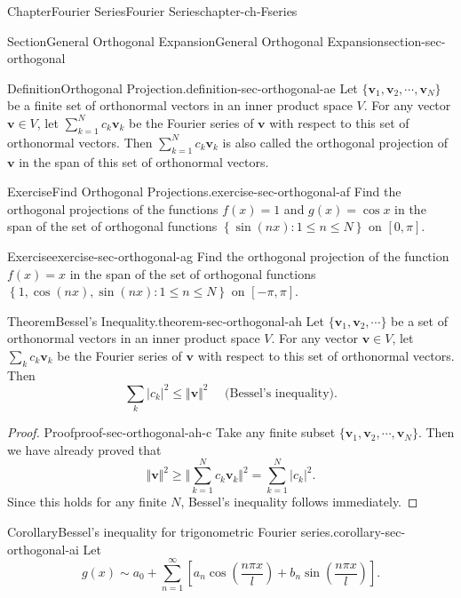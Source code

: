 \documentclass[oneside,10pt,]{book}
\numberwithin{equation}{section}
\newcommand{\bv}{\mathbf{v}}
\begin{document}
\begin{chapterptx}{Chapter}{Fourier Series}{}{Fourier Series}{}{}{chapter-ch-Fseries}
\begin{sectionptx}{Section}{General Orthogonal Expansion}{}{General Orthogonal Expansion}{}{}{section-sec-orthogonal}
\begin{definition}{Definition}{Orthogonal Projection.}{definition-sec-orthogonal-ae}
 Let \(\{\bv_{1}, \bv_{2},\cdots, \bv_{N} \}\) be a finite set of orthonormal vectors in an inner product space \(V\). For any vector \(\bv\in V\), let \(\sum_{k=1}^{N} c_{k} \bv_{k}\) be the Fourier series of \(\bv\) with respect to this set of orthonormal vectors. Then \(\sum_{k=1}^{N} c_{k} \bv_{k}\) is also called the orthogonal projection of \(\bv\) in the span of this set of orthonormal vectors.\end{definition}
\begin{inlineexercise}{Exercise}{Find Orthogonal Projections.}{exercise-sec-orthogonal-af}%
Find the orthogonal projections of the functions \(f(x)=1\) and \(g(x)=\cos x\)  in the span of  the set of orthogonal functions \(\left\{ \sin (nx): 1\le n \le  N\right\}\) on \([0, \pi]\).\end{inlineexercise}%
\begin{inlineexercise}{Exercise}{}{exercise-sec-orthogonal-ag}%
Find the orthogonal projection of the function \(f(x)=x\) in the span of  the set of orthogonal functions \(\left\{1, \cos (nx),  \sin (nx): 1\le n \le  N\right\}\) on \([-\pi, \pi]\).\end{inlineexercise}%
\begin{theorem}{Theorem}{Bessel's Inequality.}{}{theorem-sec-orthogonal-ah}%
Let \(\{\bv_{1}, \bv_{2},\cdots \}\) be a set of orthonormal vectors in an inner product space \(V\). For any vector \(\bv\in V\), let \(\sum_{k} c_{k} \bv_{k}\) be the Fourier series of \(\bv\) with respect to this set of orthonormal vectors. Then%
\begin{equation*}
\sum_{k} |c_{k}|^{2}\le \Vert \bv\Vert^{2} \quad\text{ (Bessel's inequality)}.
\end{equation*}
\end{theorem}
\begin{proof}{Proof}{}{proof-sec-orthogonal-ah-c}
Take any finite subset \(\{\bv_{1}, \bv_{2},\cdots, \bv_{N}\}\). Then we have already proved that%
\begin{equation*}
\Vert \bv\Vert^{2}\ge \Vert \sum_{k=1}^{N }  c_{k }\bv_{k}\Vert^{2}=  \sum_{k=1}^{N} |c_{k}|^{2}.
\end{equation*}
Since this holds for any finite \(N\), Bessel's inequality follows immediately.\end{proof}
\begin{corollary}{Corollary}{Bessel's inequality for trigonometric Fourier series.}{}{corollary-sec-orthogonal-ai}%
Let%
\begin{equation*}
g(x)\sim a_0 +\sum_{n=1}^{\infty}\left[ a_n \cos \left(\frac{n \pi x}{l}\right) + b_n \sin \left(\frac{n \pi x}{l}\right) \right].

\end{equation*}
\end{corollary}
\end{sectionptx}
\end{chapterptx}
\end{document}
